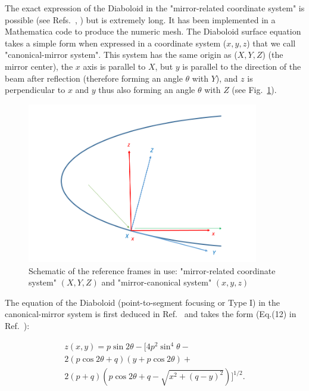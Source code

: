 \documentclass{iucr}              %
\begin{document}
The exact expression of the Diaboloid in the "mirror-related coordinate system" is possible (see  Refs.~\cite{Valeriy2020a}, \cite{Valeriy2020b}) but is extremely long. It has been implemented in a Mathematica code \cite{lacey} to produce the numeric mesh. The Diaboloid surface equation takes a simple form \cite{Valeriy2020a} when expressed in a coordinate system ($x,y,z$) that we call "canonical-mirror system". This system has the same origin as ($X,Y,Z$) (the mirror center), the $x$ axis is parallel to $X$, but $y$ is parallel to the direction of the beam after reflection (therefore forming an angle $\theta$ with $Y$), and $z$ is perpendicular to $x$ and $y$ thus also forming an angle $\theta$ with $Z$ (see Fig.~\ref{fig:frame}).

\begin{figure}[h]
\centering
\includegraphics[width=0.9\textwidth]{figures/diaboloid_frame.png}
\caption{\label{fig:frame}Schematic of the reference frames in use: "mirror-related coordinate system" $(X,Y,Z)$ and "mirror-canonical system" $(x,y,z)$}
\end{figure}

The equation of the Diaboloid (point-to-segment focusing or Type I) in the canonical-mirror system is first deduced in Ref.~\cite{Valeriy2020a} and takes the form (Eq.(12) in Ref.~\cite{Valeriy2020b}):

\begin{multline}
\label{eqn:diaboloidV}
z(x,y) = p \sin2\theta - 
[ 4 p^2 \sin^4\theta - \\
2 (p \cos2\theta+q) (y + p  \cos2\theta) + \\
2 (p+q) (p \cos2\theta + q - \sqrt{x^2 + (q-y)^2}) ]^{1/2}.
\end{multline}
\end{document}
